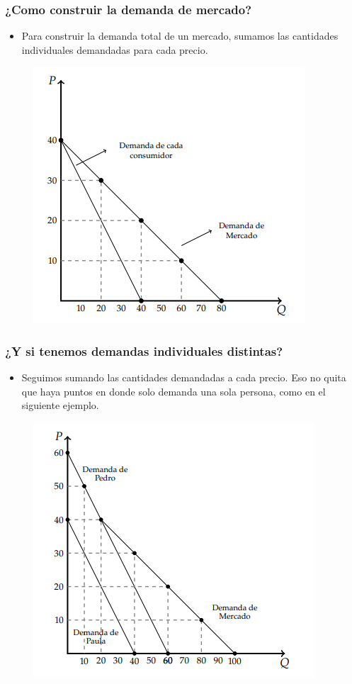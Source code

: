 \documentclass{beamer}
\begin{document}
\begin{frame}
  \frametitle{¿Como construir la demanda de mercado?}
  \begin{itemize}
    \item Para construir la demanda total de un mercado, sumamos las cantidades individuales demandadas para cada precio.
  \end{itemize}
  \begin{figure}[H]
    \centering
    \includegraphics[scale=0.8]{../Figures/C10.2.png}      
  \end{figure} 
\end{frame}

\begin{frame}
  \frametitle{¿Y si tenemos demandas individuales distintas?}
  \begin{itemize}
    \item Seguimos sumando las cantidades demandadas a cada precio. Eso no quita que haya puntos en donde solo demanda una sola persona, como en el siguiente ejemplo.
  \end{itemize}
  \begin{figure}[H]
    \centering
    \includegraphics[scale=0.8]{../Figures/C10.3.png}       
  \end{figure}
\end{frame}
\end{document}
